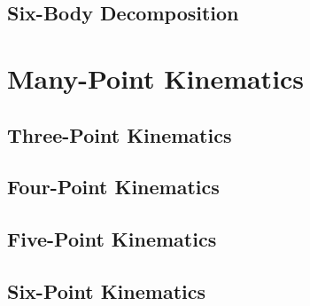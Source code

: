 \documentclass[letterpaper, 12pt]{report}
\begin{document}
\chapter{Six-Body Decomposition}

\part{Many-Point Kinematics}

\chapter{Three-Point Kinematics}
\chapter{Four-Point Kinematics}
\chapter{Five-Point Kinematics}
\chapter{Six-Point Kinematics}
\end{document}
